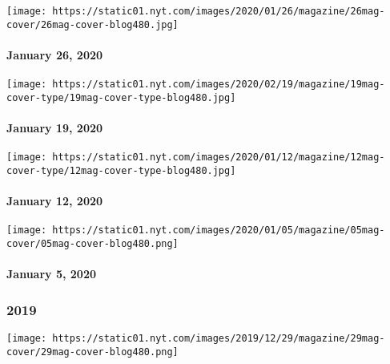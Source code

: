 \href{https://www.nytimes.com/issue/magazine/2020/01/23/the-12620-issue}{}

\texttt{[image: https://static01.nyt.com/images/2020/01/26/magazine/26mag-cover/26mag-cover-blog480.jpg]}

\hypertarget{january-26-2020}{%
\paragraph{January 26, 2020}\label{january-26-2020}}

\href{https://www.nytimes.com/issue/magazine/2020/01/21/the-11920-issue}{}

\texttt{[image: https://static01.nyt.com/images/2020/02/19/magazine/19mag-cover-type/19mag-cover-type-blog480.jpg]}

\hypertarget{january-19-2020}{%
\paragraph{January 19, 2020}\label{january-19-2020}}

\href{https://www.nytimes.com/issue/magazine/2020/01/09/the-11220-issue}{}

\texttt{[image: https://static01.nyt.com/images/2020/01/12/magazine/12mag-cover-type/12mag-cover-type-blog480.jpg]}

\hypertarget{january-12-2020}{%
\paragraph{January 12, 2020}\label{january-12-2020}}

\href{https://www.nytimes.com/issue/magazine/2020/01/02/the-1520-issue}{}

\texttt{[image: https://static01.nyt.com/images/2020/01/05/magazine/05mag-cover/05mag-cover-blog480.png]}

\hypertarget{january-5-2020}{%
\paragraph{January 5, 2020}\label{january-5-2020}}

\hypertarget{2019}{%
\subsubsection{2019}\label{2019}}

\href{https://www.nytimes.com/issue/magazine/2019/12/24/the-122919-issue}{}

\texttt{[image: https://static01.nyt.com/images/2019/12/29/magazine/29mag-cover/29mag-cover-blog480.png]}

